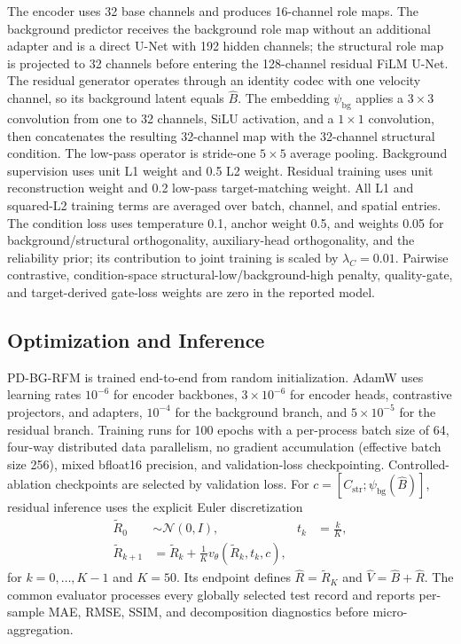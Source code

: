 The encoder uses 32 base channels and produces 16-channel role maps. The background predictor receives the background role map without an additional adapter and is a direct U-Net with 192 hidden channels; the structural role map is projected to 32 channels before entering the 128-channel residual FiLM U-Net. The residual generator operates through an identity codec with one velocity channel, so its background latent equals $\hat B$. The embedding $\psi_{\mathrm{bg}}$ applies a $3\times3$ convolution from one to 32 channels, SiLU activation, and a $1\times1$ convolution, then concatenates the resulting 32-channel map with the 32-channel structural condition. The low-pass operator is stride-one $5\times5$ average pooling. Background supervision uses unit L1 weight and 0.5 L2 weight. Residual training uses unit reconstruction weight and 0.2 low-pass target-matching weight. All L1 and squared-L2 training terms are averaged over batch, channel, and spatial entries. The condition loss uses temperature 0.1, anchor weight 0.5, and weights 0.05 for background/structural orthogonality, auxiliary-head orthogonality, and the reliability prior; its contribution to joint training is scaled by $\lambda_C=0.01$. Pairwise contrastive, condition-space structural-low/background-high penalty, quality-gate, and target-derived gate-loss weights are zero in the reported model.

\subsection{Optimization and Inference}
PD-BG-RFM is trained end-to-end from random initialization. AdamW \cite{loshchilov2019decoupled} uses learning rates $10^{-6}$ for encoder backbones, $3\times10^{-6}$ for encoder heads, contrastive projectors, and adapters, $10^{-4}$ for the background branch, and $5\times10^{-5}$ for the residual branch. Training runs for 100 epochs with a per-process batch size of 64, four-way distributed data parallelism, no gradient accumulation (effective batch size 256), mixed bfloat16 precision, and validation-loss checkpointing. Controlled-ablation checkpoints are selected by validation loss. For $c=[C_{\mathrm{str}};\psi_{\mathrm{bg}}(\hat B)]$, residual inference uses the explicit Euler discretization
\begin{align}
\widetilde R_0&\sim\mathcal N(0,I),
&t_k&=\frac{k}{K},\nonumber\\
\widetilde R_{k+1}
&=\widetilde R_k+\frac{1}{K}v_\theta(\widetilde R_k,t_k,c),
\label{eq:euler-inference}
\end{align}
for $k=0,\ldots,K-1$ and $K=50$. Its endpoint defines $\hat R=\widetilde R_K$ and $\hat V=\hat B+\hat R$. The common evaluator processes every globally selected test record and reports per-sample MAE, RMSE, SSIM, and decomposition diagnostics before micro-aggregation.

